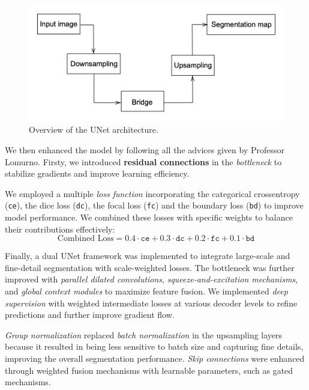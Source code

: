\documentclass[11pt]{article}
\begin{document}
\begin{multicols*}{2}
    \begin{figure}[H]
    \centering
    \includegraphics[width=\linewidth]{figures/U.png}
    \caption{Overview of the UNet architecture.}
    \label{fig:U}
    \end{figure}
    
    \noindent We then enhanced the model by following all the advices given by Professor Lomurno. Firsty, we  introduced \textbf{residual connections} in the \emph{bottleneck} to stabilize gradients and improve learning efficiency.

    We employed a multiple \textit{loss function} incorporating the categorical crossentropy (\texttt{ce}), the dice loss (\texttt{dc}), the focal loss (\texttt{fc}) and the boundary loss (\texttt{bd}) to improve model performance. We combined these losses with specific weights to balance their contributions effectively:
    \begin{equation*}
    \text{Combined Loss} = 0.4 \cdot \texttt{ce} + 0.3 \cdot \texttt{dc} + 0.2 \cdot \texttt{fc} + 0.1 \cdot \texttt{bd}
    \end{equation*}

    \noindent Finally, a dual UNet framework was implemented to integrate large-scale and fine-detail segmentation with scale-weighted losses. The bottleneck was further improved with \emph{parallel dilated convolutions}, \emph{squeeze-and-excitation mechanisms}, and \emph{global context modules} to maximize feature fusion. We implemented \emph{deep supervision} with weighted intermediate losses at various decoder levels to refine predictions and further improve gradient flow. 

    \emph{Group normalization} replaced \emph{batch normalization} in the upsampling layers because it resulted in being less sensitive to batch size and capturing fine details, improving the overall segmentation performance. \emph{Skip connections} were enhanced through weighted fusion mechanisms with learnable parameters, such as gated mechanisms. 


\end{multicols*}
\end{document}
